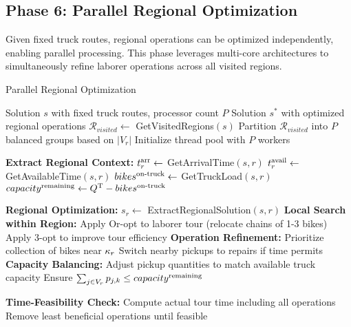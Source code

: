 \subsection{Phase 6: Parallel Regional Optimization}

Given fixed truck routes, regional operations can be optimized independently, enabling parallel processing. This phase leverages multi-core architectures to simultaneously refine laborer operations across all visited regions.

\begin{algorithm}[htbp]
    \caption{Parallel Regional Optimization}
    \label{alg:parallel}
    \begin{algorithmic}[1]
        \Require Solution $s$ with fixed truck routes, processor count $P$
        \Ensure Solution $s^*$ with optimized regional operations
        \State $\mathcal{R}_{visited} \leftarrow$ GetVisitedRegions$(s)$
        \State Partition $\mathcal{R}_{visited}$ into $P$ balanced groups based on $|V_r|$
        \State Initialize thread pool with $P$ workers

         
        \State \textbf{Extract Regional Context:}
        \State $t^{\text{arr}}_r \leftarrow$ GetArrivalTime$(s, r)$
        \State $t^{\text{avail}}_r \leftarrow$ GetAvailableTime$(s, r)$
        \State $bikes^{\text{on-truck}} \leftarrow$ GetTruckLoad$(s, r)$
        \State $capacity^{\text{remaining}} \leftarrow Q^{\text{T}} - bikes^{\text{on-truck}}$

        \State \textbf{Regional Optimization:}
        \State $s_r \leftarrow$ ExtractRegionalSolution$(s, r)$
        \State \textbf{Local Search within Region:}
        \State Apply Or-opt to laborer tour (relocate chains of 1-3 bikes)
        \State Apply 3-opt to improve tour efficiency
        \State \textbf{Operation Refinement:}
        \State Prioritize collection of bikes near $\kappa_r$
        \State Switch nearby pickups to repairs if time permits
        \EndIf
        \State \textbf{Capacity Balancing:}
        \State Adjust pickup quantities to match available truck capacity
        \State Ensure $\sum_{j \in V_r} p_{j,k} \leq capacity^{\text{remaining}}$
        \EndFor

        \State \textbf{Time-Feasibility Check:}
        \State Compute actual tour time including all operations
        \State Remove least beneficial operations until feasible
        \EndIf


\end{algorithmic}
\end{algorithm}
